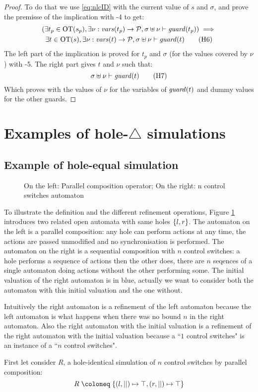 \documentclass{article}
\begin{document}
\begin{proof}
	To do that we use \eqref{eq:nlcID} with the current value of \(s\) and \(\sigma\), and prove the premisse of the implication with \hyp{4} to get:
	\begin{multline}
		\mpar{\exists t_p \in \fOT{s_p}, \exists \nu: \fvars{t_p} \to \values, \sigma \uplus \nu \vdash \fguard{t_p}} \implies \\
		\exists t \in \fOT{s}, \exists \nu: \fvars{t} \to \values, \sigma \uplus \nu \vdash \fguard{t} \hyp{6}
	\end{multline}
	The left part of the implication is proved for \(t_p\) and \(\sigma\) (for the values covered by \(\nu\)) with \hyp{5}.
	The right part gives \(t\) and \(\nu\) such that:
	\[ \sigma \uplus \nu \vdash \fguard{t} \hyp{7} \]
	Which proves  with the values of \(\nu\) for the variables of \(\mathit{guard}{\left(t\right)}\) and dummy values for the other guards.
\end{proof}

\section{Examples of hole-\(\triangle\) simulations}\label{apx:refrel}
\subsection{Example of hole-equal simulation}
\begin{exi}
\begin{figure}
\centering

\vrule

\caption{On the left: Parallel composition operator; On the right: n control switches automaton}
\label{fig:hisim}
\end{figure}
To illustrate the definition and the different refinement operations, Figure \ref{fig:hisim} introduces two related open automata with same holes \({\left\{l, r\right\}}\).
The automaton on the left is a parallel composition: any hole can perform actions at any time, the actions are passed unmodified and no synchronisation is performed.
The automaton on the right is a sequential composition with \(n\) control switches: a hole performs a sequence of actions then the other does, there are \(n\) seqences of a single automaton doing actions without the other performing some.
The initial valuation of the right automaton is in blue, actually we want to consider both the automaton with this initial valuation and the one without.

Intuitively the right automaton is a refinement of the left automaton because the left automaton is what happens when there was no bound \(n\) in the right automaton.
Also the right automaton with the initial valuation is a refinement of the right automaton with the initial valuation because a ``\(1\) control switches" is an instance of a ``\(n\) control switches".

First let consider \(R\), a hole-identical simulation of \(n\) control switches by parallel composition:
\[ R \defobject \mbrc{\mpar{l, ||} \mapsto \top, \mpar{r, ||} \mapsto \top} \]
\end{exi}
\end{document}
